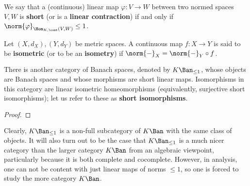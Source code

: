         \begin{definition} \label{def: short_linear_maps}
            We say that a (continuous) linear map $\varphi: V \to W$ between two normed spaces $V, W$ is \textbf{short} (or is a \textbf{linear contraction}) if and only if $\norm{\varphi}_{\Hom_{K, \cont}(V, W)} \leq 1$. 
        \end{definition}
        \begin{definition}[Isometries] \label{def: isometries}
            Let $(X, d_X), (Y, d_Y)$ be metric spaces. A continuous map $f: X \to Y$ is said to be \textbf{isometric} (or to be an \textbf{isometry}) if $\norm{-}_X = \norm{-}_Y \circ f$. 
        \end{definition}
        \begin{proposition} \label{prop: category_of_banach_spaces_and_short_linear_maps}
            There is another category of Banach spaces, denoted by $K\-\Ban_{\leq 1}$, whose objects are Banach spaces and whose morphisms are short linear maps. Isomorphisms in this category are linear isometric homeomorphisms (equivalently, surjective short isomorphisms); let us refer to these as \textbf{short isomorphisms}.
        \end{proposition}
            \begin{proof}
                
            \end{proof}
        Clearly, $K\-\Ban_{\leq 1}$ is a non-full subcategory of $K\-\Ban$ with the same class of objects. It will also turn out to be the case that $K\-\Ban_{\leq 1}$ is a much nicer category than the larger category $K\-\Ban$ from an algebraic viewpoint, particularly because it is both complete and cocomplete. However, in analysis, one can not be content with just linear maps of norms $\leq 1$, so one is forced to study the more  category $K\-\Ban$.
            
